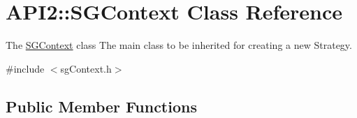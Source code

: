 \hypertarget{class_a_p_i2_1_1_s_g_context}{\section{A\-P\-I2\-:\-:S\-G\-Context Class Reference}
\label{class_a_p_i2_1_1_s_g_context}
}


The \hyperlink{class_a_p_i2_1_1_s_g_context}{S\-G\-Context} class The main class to be inherited for creating a new Strategy.  




{\ttfamily \#include $<$sg\-Context.\-h$>$}

\subsection*{Public Member Functions}
